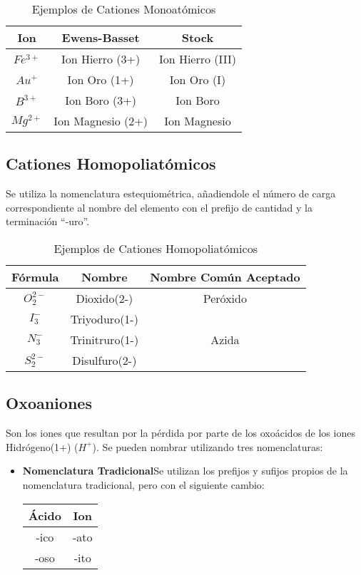 \documentclass[11pt,fleqn]{book} %
\begin{document}
\begin{table}[h!]
	\centering\begin{tabular}{c|cc}
		Ion&Ewens-Basset&Stock \\ \hline
		$Fe^{3+}$&Ion Hierro (3+)&Ion Hierro (III)\\
		$Au^{+}$&Ion Oro (1+)&Ion Oro (I)\\
		$B^{3+}$&Ion Boro (3+)&Ion Boro\\
		$Mg^{2+}$&Ion Magnesio (2+)&Ion Magnesio \\ \hline
	\end{tabular}
	\caption{Ejemplos de Cationes Monoatómicos}
\end{table}
\subsection{Cationes Homopoliatómicos}
Se utiliza la nomenclatura estequiométrica, añadiendole el número de carga correspondiente al nombre del elemento con el prefijo de cantidad y la terminación “-uro”.
\begin{table}[h!]
	\centering
	\begin{tabular}{c|cc}
		Fórmula&Nombre&Nombre Común Aceptado\\ \hline
		$O_{2}^{2-}$&Dioxido(2-)&Peróxido\\
		$I_{3}^{-}$&Triyoduro(1-)&\\
		$N_{3}^{-}$&Trinitruro(1-)&Azida\\
		$S_{2}^{2-}$&Disulfuro(2-)&\\ \hline
	\end{tabular}
		\caption{Ejemplos de Cationes Homopoliatómicos}
\end{table}

\subsection{Oxoaniones}
Son los iones que resultan por la pérdida por parte de los oxoácidos de los iones Hidrógeno(1+) ($H^{+}$). Se pueden nombrar utilizando tres nomenclaturas:\\

\begin{itemize}
	\item\textbf{Nomenclatura Tradicional}Se utilizan los prefijos y sufijos propios de la nomenclatura tradicional, pero con el siguiente cambio:
	\begin{table}[h!]
		\centering
		\begin{tabular}{c|c}
			Ácido&Ion\\ \hline
			-ico&-ato\\
			-oso&-ito\\ \hline
		\end{tabular}
	\end{table}
\end{itemize}
\end{document}
